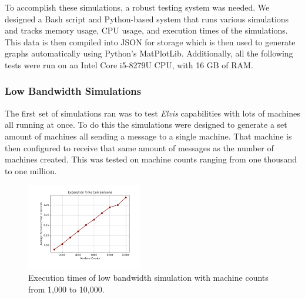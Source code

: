 \documentclass[journal]{IEEEtran} %
\newcommand{\imagewidth}{0.45\textwidth}
\newcommand{\elvis}{\textit{Elvis}}
\begin{document}
To accomplish these simulations, a robust testing system was needed. We designed a Bash script and Python-based system that runs various simulations and tracks memory usage, CPU usage, and execution times of the simulations. This data is then compiled into JSON for storage which is then used to generate graphs automatically using Python’s MatPlotLib. Additionally, all the following tests were run on an Intel Core i5-8279U CPU, with 16 GB of RAM.

\subsubsection{Low Bandwidth Simulations}

The first set of simulations ran was to test \elvis{} capabilities with lots of machines all running at once. To do this the simulations were designed to generate a set amount of machines all sending a message to a single machine. That machine is then configured to receive that same amount of messages as the number of machines created. This was tested on machine counts ranging from one thousand to one million.

\begin{figure}[H]
    \centerline{\includegraphics[width=\imagewidth]{Images/low_band_one_to_ten.png}}
    \caption{Execution times of low bandwidth simulation with machine counts from 1,000 to 10,000.}
    \label{fig:low_band_one_to_ten}
\end{figure}
\end{document}
